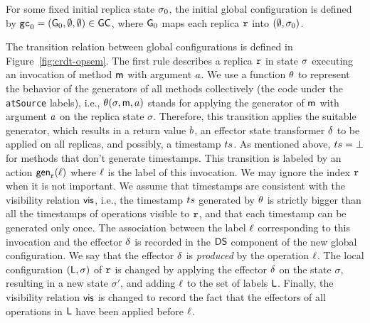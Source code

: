 For some fixed initial replica state $\sigma_0$, the initial global configuration is defined by $\mathtt{gc}_0 = (\mathsf{G}_0, \emptyset, \emptyset) \in \mathsf{GC}$, where $\mathsf{G}_0$ maps each replica $\mathtt{r}$ into $(\emptyset, \sigma_0)$.


The transition relation between global configurations is defined in
Figure~\ref{fig:crdt-opsem}.
The first rule describes a replica $\mathtt{r}$ in state $\sigma$
executing an invocation of method $\mathsf{m}$ with argument $a$.
We use a function $\theta$ to represent the behavior of the generators of all methods collectively (the code under the \lstinline|atSource| labels),
i.e., $\theta(\sigma,\mathsf{m},a)$ stands for applying the generator of $\mathsf{m}$ with argument $a$ on the
replica state $\sigma$. Therefore, this transition applies the suitable generator, 
which results in a 
return value $b$, an effector state transformer $\delta$
to be applied on all replicas, and possibly, a timestamp $ts$.
As mentioned above, $ts=\bot$ for methods that don't generate
timestamps. This transition is labeled by an action $\mathsf{gen}_{\mathtt{r}}(\ell)$ where
$\ell$ is the label of this invocation. We may ignore the index $\mathtt{r}$ when it is not important.
We assume that timestamps are consistent with the visibility relation
$\mathsf{vis}$, i.e., the timestamp $ts$ generated by $\theta$ is strictly bigger than
all the timestamps of operations visible to $\mathtt{r}$, and that each timestamp can be generated only once.
The association between the label $\ell$ corresponding to this
invocation and the effector $\delta$ is recorded in the
$\mathsf{DS}$ component of the new global configuration.
We say that the effector $\delta$ is \emph{produced} by the operation $\ell$.
The local configuration $(\mathsf{L},\sigma)$ of $\mathtt{r}$ is changed by
applying the effector $\delta$ on the state $\sigma$, resulting
in a new state $\sigma'$, and adding $\ell$ to the set of labels
$\mathsf{L}$.
Finally, the visibility relation $\mathsf{vis}$ is changed to record the
fact that the effectors of all operations in $\mathsf{L}$ have been
applied before $\ell$.
%



